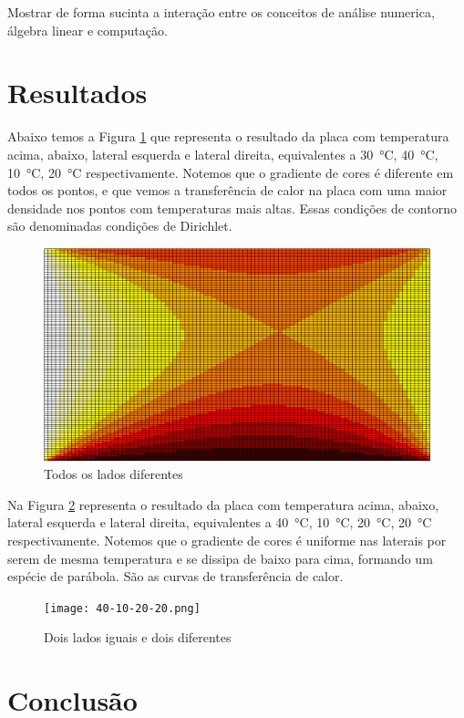 \documentclass[12pt,a4paper]{article}
\begin{document}
Mostrar de forma sucinta a interação entre os conceitos de análise numerica, álgebra linear e computação.

\section{Resultados}

Abaixo temos a Figura \ref{fig:1} que representa o resultado da placa com temperatura acima, abaixo, lateral esquerda e lateral direita, equivalentes a \SI{30}{\celsius}, \SI{40}{\celsius}, \SI{10}{\celsius}, \SI{20}{\celsius} respectivamente. Notemos que o gradiente de cores é diferente em todos os pontos, e que vemos a transferência de calor na placa com uma maior densidade nos pontos com temperaturas mais altas. Essas condições de contorno são denominadas condições de Dirichlet.

\begin{figure}[ht]
\centering
\includegraphics[width=.7\textwidth]{10-20-30-40.png}
\caption{Todos os lados diferentes}
\label{fig:1}
\end{figure}

Na Figura \ref{fig:2} representa o resultado da placa com temperatura acima, abaixo, lateral esquerda e lateral direita, equivalentes a \SI{40}{\celsius}, \SI{10}{\celsius}, \SI{20}{\celsius}, \SI{20}{\celsius} respectivamente. Notemos que o gradiente de cores é uniforme nas laterais por serem de mesma temperatura e se dissipa de baixo para cima, formando um espécie de parábola. São as curvas de transferência de calor.

\begin{figure}[h]
\centering
\texttt{[image: 40-10-20-20.png]}
\caption{Dois lados iguais e dois diferentes}
\label{fig:2}
\end{figure}

\section{Conclusão}
\end{document}
